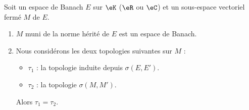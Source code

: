 \begin{proposition}	\label{PROPooGQLOooNSgZnZ}
	Soit un espace de Banach \( E\) sur \( \eK\) (\( \eR\) ou \( \eC\)) et un sous-espace vectoriel fermé \( M\) de \( E\).
	\begin{enumerate}
		\item
		      \( M\) muni de la norme hérité de \( E\) est un espace de Banach.
		\item
		      Nous considérons les deux topologies suivantes sur \( M\) :
		      \begin{itemize}
			      \item
			            \( \tau_1\) : la topologie induite depuis \( \sigma(E,E')\).
			      \item
			            \( \tau_2\) : la topologie \( \sigma(M,M')\).
		      \end{itemize}
		      Alors \( \tau_1=\tau_2\).
	\end{enumerate}
\end{proposition}

